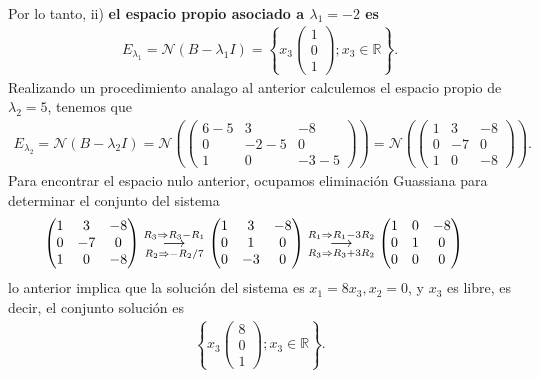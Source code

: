\documentclass[11pt,letterpaper]{article}
\newcommand{\mR}{\mathbb{R}}
\newcommand{\mcN}{\mathcal{N}}
\newcommand{\grstep}[2][\relax]{%
   \ensuremath{\mathrel{
       {\mathop{\longrightarrow}\limits^{#2\mathstrut}_{
                                     \begin{subarray}{l} #1 \end{subarray}}}}}}
\begin{document}
\begin{enumerate}
\begin{align*}
\end{align*}
Por lo tanto, ii) \textbf{el espacio propio asociado a $\lambda_1=-2$ es}
\begin{align*}
E_{\lambda_1} = \mcN(B-\lambda_1 I) =\left\{x_3\begin{pmatrix}
1\\
0\\
1
\end{pmatrix}; x_3\in \mR \right\}.
\end{align*}
Realizando un procedimiento analago al anterior calculemos el espacio propio de $\lambda_2=5$, tenemos que 
\begin{align*}
E_{\lambda_2} = \mcN(B-\lambda_2 I) =\mcN\left( \begin{pmatrix}
6-5 & 3 &-8\\
0 & -2-5 & 0\\
1 & 0 & -3-5
\end{pmatrix} \right)=\mcN\left( \begin{pmatrix}
1 & 3 &-8\\
0 &-7 &0\\
1 & 0 &-8
\end{pmatrix} \right).
\end{align*}
Para encontrar el espacio nulo anterior, ocupamos eliminación Guassiana para determinar el conjunto del sistema
\begin{align*}
&\begin{pmatrix}
1 & 3 &-8\\
0 &-7 &0\\
1 & 0 &-8
\end{pmatrix}%
\grstep[R_2\Rightarrow -R_2/7]{R_3 \Rightarrow R_3-R_1}
%
\begin{pmatrix}
1 & 3 &-8\\
0 & 1 &0\\
0 & -3&0
\end{pmatrix}%
\grstep[R_3\Rightarrow R_3+3R_2]{R_1 \Rightarrow R_1-3R_2}
%
\begin{pmatrix}
1 & 0 &-8\\
0 & 1 &0\\
0 & 0&0
\end{pmatrix}
\end{align*}
lo anterior implica que la solución del sistema es $x_1=8x_3, x_2=0$, y $x_3$ es libre, es decir, el conjunto solución es
\begin{align*}
\left\{x_3\begin{pmatrix}
8\\
0\\
1
\end{pmatrix}; x_3\in \mR \right\}.

\end{align*}
\end{enumerate}
\end{document}
